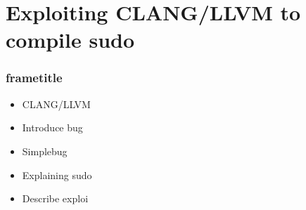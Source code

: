 \section{Exploiting CLANG/LLVM to compile sudo}

\begin{frame}
  \frametitle{frametitle}
%
\begin{itemize}
  \item CLANG/LLVM
  \item Introduce bug
  \item Simplebug
  \item Explaining sudo
  \item Describe exploi
\end{itemize}
%
\end{frame}
